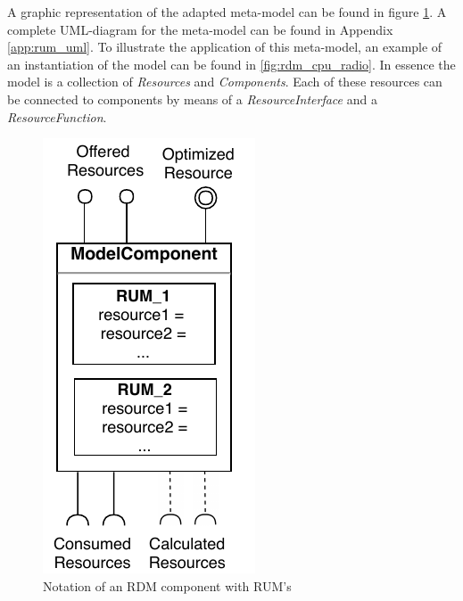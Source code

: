 A graphic representation of the adapted meta-model can be found in figure \ref{fig:component}. A complete UML-diagram for the meta-model can be found in Appendix \ref{app:rum_uml}. To illustrate the application of this meta-model, an example of an instantiation of the model can be found in \ref{fig:rdm_cpu_radio}. In essence the model is a collection of \emph{Resources} and \emph{Components}. Each of these resources can be connected to components by means of a \emph{ResourceInterface} and a \emph{ResourceFunction}. 
\begin{figure}
\centering
  \includegraphics[width=0.3\linewidth]{resources/img/component.pdf}
  \caption{Notation of an RDM component with RUM's}
  \label{fig:component}
\end{figure}
